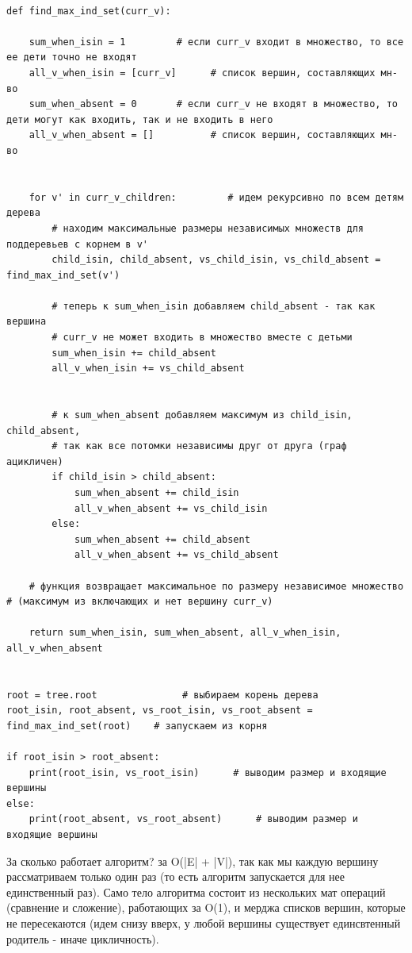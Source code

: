 \documentclass{article}
\begin{document}
\begin{verbatim}

def find_max_ind_set(curr_v):

    sum_when_isin = 1         # если curr_v входит в множество, то все ее дети точно не входят
    all_v_when_isin = [curr_v]      # список вершин, составляющих мн-во
    sum_when_absent = 0       # если curr_v не входят в множество, то дети могут как входить, так и не входить в него
    all_v_when_absent = []          # список вершин, составляющих мн-во
    

    for v' in curr_v_children:         # идем рекурсивно по всем детям дерева
        # находим максимальные размеры независимых множеств для поддеревьев с корнем в v'
        child_isin, child_absent, vs_child_isin, vs_child_absent = find_max_ind_set(v')  

        # теперь к sum_when_isin добавляем child_absent - так как вершина  
        # curr_v не может входить в множество вместе с детьми
        sum_when_isin += child_absent             
        all_v_when_isin += vs_child_absent

        
        # к sum_when_absent добавляем максимум из child_isin, child_absent, 
        # так как все потомки независимы друг от друга (граф ацикличен)
        if child_isin > child_absent:
            sum_when_absent += child_isin
            all_v_when_absent += vs_child_isin
        else:
            sum_when_absent += child_absent
            all_v_when_absent += vs_child_absent

    # функция возвращает максимальное по размеру независимое множество # (максимум из включающих и нет вершину curr_v)
    
    return sum_when_isin, sum_when_absent, all_v_when_isin, all_v_when_absent     
        

root = tree.root               # выбираем корень дерева
root_isin, root_absent, vs_root_isin, vs_root_absent = find_max_ind_set(root)    # запускаем из корня

if root_isin > root_absent:
    print(root_isin, vs_root_isin)      # выводим размер и входящие вершины
else:
    print(root_absent, vs_root_absent)      # выводим размер и входящие вершины
\end{verbatim}

За сколько работает алгоритм? за O(|E| + |V|), так как мы каждую вершину рассматриваем только один раз (то есть алгоритм запускается для нее единственный раз). Само тело алгоритма состоит из нескольких мат операций (сравнение и сложение), работающих за O(1), и мерджа списков вершин, которые не пересекаются (идем снизу вверх, у любой вершины существует единсвтенный родитель - иначе цикличность).
\end{document}
